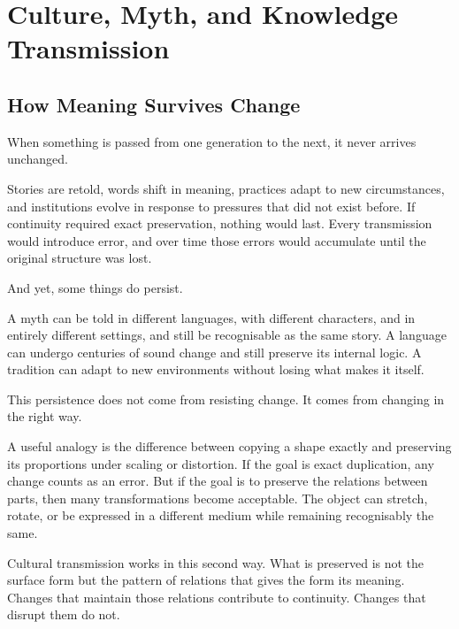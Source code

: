 \documentclass[11pt,openany]{book}
\begin{document}

\chapter{Culture, Myth, and Knowledge Transmission}
\label{ch:culture}

\section*{ How Meaning Survives Change}

When something is passed from one generation to the next,
it never arrives unchanged.

Stories are retold, words shift in meaning, practices adapt
to new circumstances, and institutions evolve in response
to pressures that did not exist before.  If continuity
required exact preservation, nothing would last.  Every
transmission would introduce error, and over time those
errors would accumulate until the original structure was
lost.

And yet, some things do persist.

A myth can be told in different languages, with different
characters, and in entirely different settings, and still
be recognisable as the same story.  A language can undergo
centuries of sound change and still preserve its internal
logic.  A tradition can adapt to new environments without
losing what makes it itself.

This persistence does not come from resisting change.  It
comes from changing in the right way.

A useful analogy is the difference between copying a shape
exactly and preserving its proportions under scaling or
distortion.  If the goal is exact duplication, any change
counts as an error.  But if the goal is to preserve the
relations between parts, then many transformations become
acceptable.  The object can stretch, rotate, or be expressed
in a different medium while remaining recognisably the same.

Cultural transmission works in this second way.  What is
preserved is not the surface form but the pattern of
relations that gives the form its meaning.  Changes that
maintain those relations contribute to continuity.  Changes
that disrupt them do not.
\end{document}
